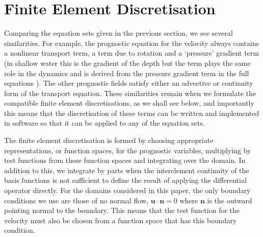 \documentclass[journal abbreviation, manuscript]{copernicus}
\def\MM#1{\boldsymbol{#1}}
\begin{document}
\section{Finite Element Discretisation}
\label{sec: FEM}

Comparing the equation sets given in the previous section, we see
several similarities. For example, the prognostic equation for the
velocity always contains a nonlinear transport term, a term due to
rotation and a `pressure' gradient term (in shallow water this is the
gradient of the depth but the term plays the same role in the dynamics
and is derived from the pressure gradient term in the full equations
\citep{zeitlin2018geophysical}). The other prognostic fields satisfy
either an advective or continuity form of the transport
equation. These similarities remain when we formulate the compatible
finite element discretisations, as we shall see below, and importantly
this means that the discretisation of these terms can be written and
implemented in software so that it can be applied to any of the
equation sets.

The finite element discretisation is formed by choosing appropriate
representations, or function spaces, for the prognostic variables,
multiplying by test functions from these function spaces and
integrating over the domain. In addition to this, we integrate by
parts when the interelement continuity of the basis functions is not
sufficient to define the result of applying the differential operator
directly. For the domains considered in this paper, the only boundary
conditions we use are those of no normal flow, $\MM{u}\cdot\MM{n}=0$
where $\MM{n}$ is the outward pointing normal to the boundary. This
means that the test function for the velocity must also be chosen from
a function space that has this boundary condition.
\end{document}
